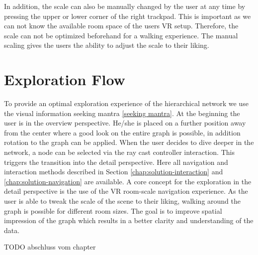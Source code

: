 In addition, the scale can also be manually changed by the user at any time by pressing the upper or lower corner of the right trackpad. 
This is important as we can not know the available room space of the users VR setup. Therefore, the scale can not be optimized beforehand for a walking experience. The manual scaling gives the users the ability to adjust the scale to their liking.
\section{Exploration Flow}
\label{chap:ps-explorationFlow}
To provide an optimal exploration experience of the hierarchical network we use the visual information seeking mantra \ref{seeking mantra}. 
At the beginning the user is in the overview perspective. He/she is placed on a further position away from the center where a good look on the entire graph is possible, in addition rotation to the graph can be applied.
When the user decides to dive deeper in the network, a node can be selected via the ray cast controller interaction. This triggers the transition into the detail perspective. 
Here all navigation and interaction methods described in Section \ref{chap:solution-interaction} and \ref{chap:solution-navigation}
are available. 
A core concept for the exploration in the detail perspective is the use of the VR room-scale navigation experience. As the user is able to tweak the scale of the scene to their liking, walking around the graph is possible for different room sizes. The goal is to improve spatial impression of the graph which results in a better clarity and understanding of the data.

TODO abschluss vom chapter